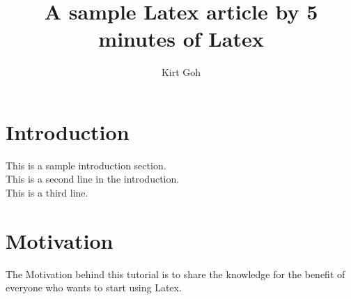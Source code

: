 \documentclass[12pt,a4paper]{article}
\begin{document}
\title{A sample Latex article by 5 minutes of Latex}
\author{Kirt Goh}
\maketitle

\section{Introduction}
This is a sample introduction section.\\
This is a second line in the introduction.\\
This is a third line.

\section{Motivation}
The Motivation behind this tutorial is to share the knowledge for the benefit of
everyone who wants to start using Latex.
\end{document}
